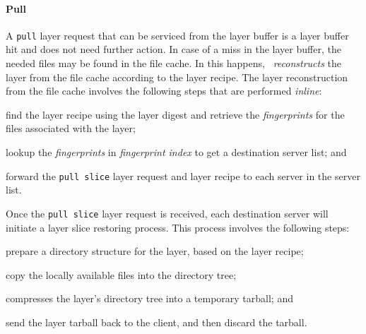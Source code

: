 %
%
%

\paragraph{Pull}
A \texttt{pull} layer request that can be serviced from the 
layer buffer is a layer buffer hit and does not need further action. 
In case of a miss in the layer buffer, the needed files may be found in the 
file cache. In this happens, 
 \sysname~\emph{reconstructs} the layer from the file cache according to the layer recipe.
%
%
The layer reconstruction from the file cache involves the following steps that are performed \emph{inline}:

\begin{compactenumerate}
	\item find the layer recipe using the layer digest and retrieve the 
\emph{fingerprints} for the files associated with the layer;
	\item lookup the \emph{fingerprints} in \emph{fingerprint index} to get a destination server list; and
	\item forward the \texttt{pull slice} layer request and layer recipe to each server in the server list.
\end{compactenumerate}

Once the \texttt{pull slice} layer request is received, each destination server will initiate a layer slice restoring process. This process involves  
the following steps: 

\begin{compactenumerate}
	\item prepare a directory structure for the layer, based on the layer recipe;
	\item copy the locally available files into the directory tree; 
	\item compresses the layer's directory tree into a temporary tarball; and
	\item send the layer tarball back to the client, and then discard the tarball.
\end{compactenumerate}

